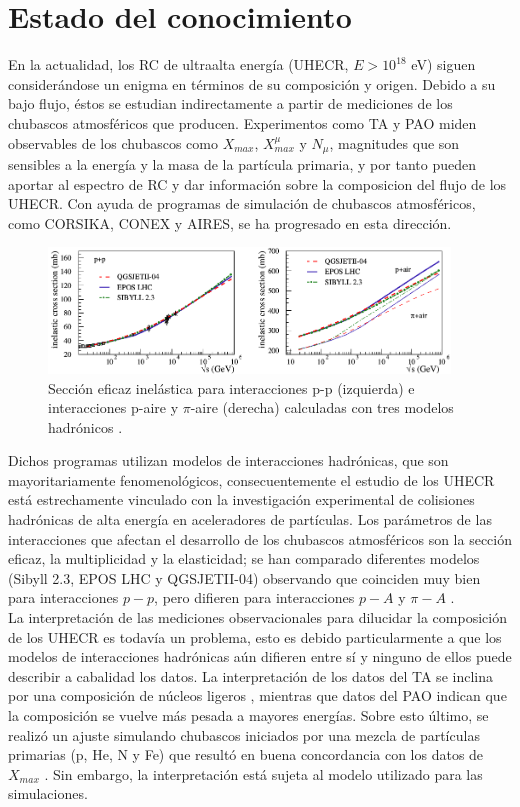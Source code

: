 \section{Estado del conocimiento}
En la actualidad, los RC de ultraalta energía (UHECR, $E > 10^{18}$ eV) siguen considerándose un enigma en términos de su composición y origen. Debido a su bajo flujo, éstos se estudian indirectamente a partir de mediciones de los chubascos atmosféricos que producen. Experimentos como TA y PAO miden observables de los chubascos como $X_{max}$, $X_{max}^{\mu}$ y $N_{\mu}$, magnitudes que son sensibles a la energía y la masa de la partícula primaria, y por tanto pueden aportar al espectro de RC y dar información sobre la composicion del flujo de los UHECR. Con ayuda de programas de simulación de chubascos atmosféricos, como CORSIKA, CONEX y AIRES, se ha progresado en esta dirección.\\

\begin{figure}[h]
\centering
\includegraphics[width=0.95\textwidth]{Figuras/Pierog2018} 
\caption{Sección eficaz inelástica para interacciones p-p (izquierda) e interacciones p-aire y $\pi$-aire (derecha) calculadas con tres modelos hadrónicos \cite{Pierog2018}.}
\label{fig:cross_sections}
\end{figure}	

Dichos programas utilizan modelos de interacciones hadrónicas, que son mayoritariamente fenomenológicos, consecuentemente el estudio de los UHECR está estrechamente vinculado con la investigación experimental de colisiones hadrónicas de alta energía en aceleradores de partículas. Los parámetros de las interacciones que afectan el desarrollo de los chubascos atmosféricos son la sección eficaz, la multiplicidad y la elasticidad; se han comparado diferentes modelos (Sibyll 2.3, EPOS LHC y QGSJETII-04) observando que coinciden muy bien para interacciones $p-p$, pero difieren para interacciones $p-A$ y $\pi-A$ \cite{Pierog2018}. \\

La interpretación de las mediciones observacionales para dilucidar la composición de los UHECR es todavía un problema, esto es debido particularmente a que los modelos de interacciones hadrónicas aún difieren entre sí y ninguno de ellos puede describir a cabalidad los datos. La interpretación de los datos del TA se inclina por una composición de núcleos ligeros \cite{TAcomposition}, mientras que datos del PAO indican que la composición se vuelve más pesada a mayores energías. Sobre esto último, se realizó un ajuste simulando chubascos iniciados por una mezcla de partículas primarias (p, He, N y Fe) que resultó en buena concordancia con los datos de $X_{max}$ \cite{PAOcomposition}. Sin embargo, la interpretación está sujeta al modelo utilizado para las simulaciones.\\

